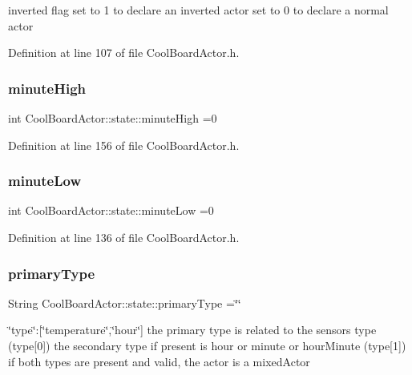 inverted flag set to 1 to declare an inverted actor set to 0 to declare a normal actor 

Definition at line 107 of file Cool\+Board\+Actor.\+h.

\mbox{\label{struct_cool_board_actor_1_1state_a4bff3d61ead74adb60be224764b93006}} 
\subsubsection{\texorpdfstring{minute\+High}{minuteHigh}}
{\footnotesize\ttfamily int Cool\+Board\+Actor\+::state\+::minute\+High =0}



Definition at line 156 of file Cool\+Board\+Actor.\+h.

\mbox{\label{struct_cool_board_actor_1_1state_acbcc2902331fd9d757cd475eb403bdd9}} 
\subsubsection{\texorpdfstring{minute\+Low}{minuteLow}}
{\footnotesize\ttfamily int Cool\+Board\+Actor\+::state\+::minute\+Low =0}



Definition at line 136 of file Cool\+Board\+Actor.\+h.

\mbox{\label{struct_cool_board_actor_1_1state_a8a0b318fd2814cf67fe74ee8164df55e}} 
\subsubsection{\texorpdfstring{primary\+Type}{primaryType}}
{\footnotesize\ttfamily String Cool\+Board\+Actor\+::state\+::primary\+Type =\char`\"{}\char`\"{}}

\char`\"{}type\char`\"{}\+:\mbox{[}\char`\"{}temperature\char`\"{},\char`\"{}hour\char`\"{}\mbox{]} the primary type is related to the sensor\textquotesingle{}s type (type\mbox{[}0\mbox{]}) the secondary type if present is hour or minute or hour\+Minute (type\mbox{[}1\mbox{]}) if both types are present and valid, the actor is a mixed\+Actor 

